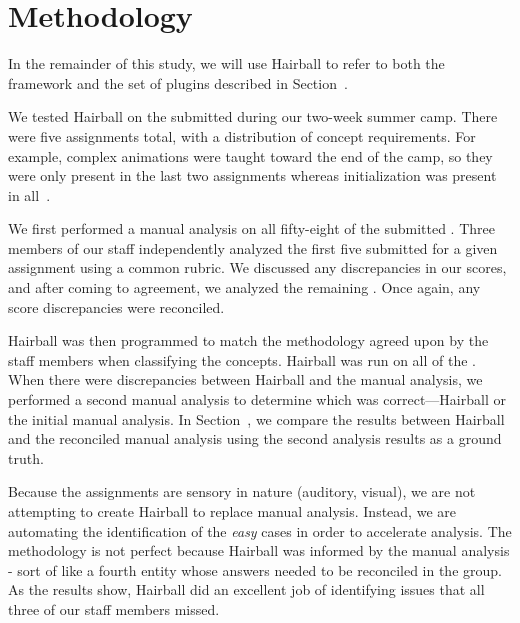 \section{Methodology} 
In the remainder of this study, we will use Hairball to refer to both the
framework and the set of plugins described in Section~.

We tested Hairball on the  submitted during our two-week summer
camp.  There were five assignments total, with a distribution of concept
requirements. For example, complex animations were taught toward the end of the
camp, so they were only present in the last two assignments whereas
initialization was present in all~\cite{Franklin:2013:SBO}.

We first performed a manual analysis on all fifty-eight of the submitted
.  Three members of our staff independently analyzed the first five
 submitted for a given assignment using a common rubric. We
discussed any discrepancies in our scores, and after coming to agreement, we
analyzed the remaining . Once again, any score discrepancies were
reconciled.

Hairball was then programmed to match the methodology agreed upon by the staff
members when classifying the concepts.  Hairball was run on all of the
.  When there were discrepancies between Hairball and the manual
analysis, we performed a second manual analysis to determine which was
correct---Hairball or the initial manual analysis. In
Section~, we compare the results between Hairball and the
reconciled manual analysis using the second analysis results as a ground truth.

Because the assignments are sensory in nature (auditory, visual), we are not
attempting to create Hairball to replace manual analysis.  Instead, we are
automating the identification of the \emph{easy} cases in order to accelerate
analysis.  The methodology is not perfect because Hairball was informed by the
manual analysis - sort of like a fourth entity whose answers needed to be
reconciled in the group.  As the results show, Hairball did an excellent job of
identifying issues that all three of our staff members missed.
